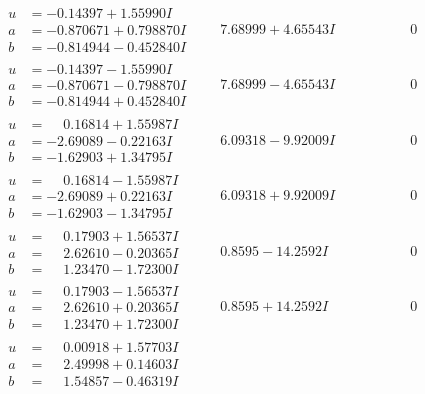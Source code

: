 \documentclass[1p]{elsarticle_modified}
\theoremstyle{definition}
\begin{document}
$$\begin{array}{c|c|c}
\begin{aligned}
u &= -0.14397 + 1.55990 I \\
a &= -0.870671 + 0.798870 I \\
b &= -0.814944 - 0.452840 I\end{aligned}
 & \phantom{-}7.68999 + 4.65543 I & \phantom{-0.000000 } 0 \\ \hline\begin{aligned}
u &= -0.14397 - 1.55990 I \\
a &= -0.870671 - 0.798870 I \\
b &= -0.814944 + 0.452840 I\end{aligned}
 & \phantom{-}7.68999 - 4.65543 I & \phantom{-0.000000 } 0 \\ \hline\begin{aligned}
u &= \phantom{-}0.16814 + 1.55987 I \\
a &= -2.69089 - 0.22163 I \\
b &= -1.62903 + 1.34795 I\end{aligned}
 & \phantom{-}6.09318 - 9.92009 I & \phantom{-0.000000 } 0 \\ \hline\begin{aligned}
u &= \phantom{-}0.16814 - 1.55987 I \\
a &= -2.69089 + 0.22163 I \\
b &= -1.62903 - 1.34795 I\end{aligned}
 & \phantom{-}6.09318 + 9.92009 I & \phantom{-0.000000 } 0 \\ \hline\begin{aligned}
u &= \phantom{-}0.17903 + 1.56537 I \\
a &= \phantom{-}2.62610 - 0.20365 I \\
b &= \phantom{-}1.23470 - 1.72300 I\end{aligned}
 & \phantom{-}0.8595 - 14.2592 I & \phantom{-0.000000 } 0 \\ \hline\begin{aligned}
u &= \phantom{-}0.17903 - 1.56537 I \\
a &= \phantom{-}2.62610 + 0.20365 I \\
b &= \phantom{-}1.23470 + 1.72300 I\end{aligned}
 & \phantom{-}0.8595 + 14.2592 I & \phantom{-0.000000 } 0 \\ \hline\begin{aligned}
u &= \phantom{-}0.00918 + 1.57703 I \\
a &= \phantom{-}2.49998 + 0.14603 I \\
b &= \phantom{-}1.54857 - 0.46319 I\end{aligned}

\end{array}$$
\end{document}
